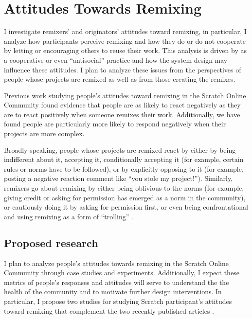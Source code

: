 \section{Attitudes Towards Remixing}

I investigate remixers' and originators' attitudes toward remixing, in particular, I analyze how participants perceive remixing and how they do or do not cooperate by letting or encouraging others to reuse their work.
This analysis is driven by as a cooperative or even ``antisocial'' practice and how the system design may influence these attitudes. 
I plan to analyze these issues from the perspectives of people whose projects are remixed as well as from those creating the remixes.
 
Previous work studying people's attitudes toward remixing in the Scratch Online Community \citep{hill_responses_2010, monroy-hernandez_computers_2011} found evidence that people are as likely to react negatively as they are to react positively when someone remixes their work. 
Additionally, we have found people are particularly more likely to respond negatively when their projects are more complex.

Broadly speaking, people whose projects are remixed react by either by being indifferent about it, accepting it, conditionally accepting it (for example, certain rules or norms have to be followed), or by explicitly opposing to it (for example, posting a negative reaction comment like ``you stole my project!'').
Similarly, remixers go about remixing by either being oblivious to the norms (for example, giving credit or asking for permission has emerged as a norm in the  community), or cautiously doing it by asking for permission first, or even being confrontational and using remixing as a form of ``trolling'' \cite{donath_identity_1998}.

\subsection{Proposed research}

I plan to analyze people's attitudes towards remixing in the Scratch Online Community through case studies and experiments.
Additionally, I expect these metrics of people's responses and attitudes will serve to understand the the health of the community and to motivate further design interventions.
In particular, I propose two studies for studying Scratch participant's attitudes toward remixing that complement the two recently published articles \citep{hill_responses_2010, monroy-hernandez_computers_2011}.


